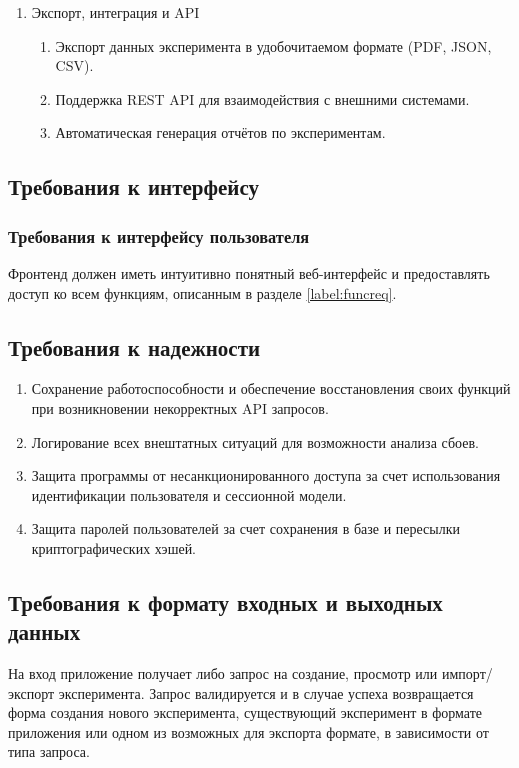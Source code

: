 \documentclass[a4paper,12pt,reqno]{article}
\begin{document}
\begin{enumerate}
        \item Экспорт, интеграция и API
    
        \begin{enumerate}
            \item Экспорт данных эксперимента в удобочитаемом формате (PDF, JSON, CSV).
            \item Поддержка REST API для взаимодействия с внешними системами.
            \item Автоматическая генерация отчётов по экспериментам.
        \end{enumerate}
    \end{enumerate}

    \subsection{Требования к интерфейсу}

    \subsubsection{Требования к интерфейсу пользователя}
    Фронтенд должен иметь интуитивно понятный веб-интерфейс и предоставлять доступ ко всем функциям, описанным в разделе \ref{label:funcreq}.

    \subsection{Требования к надежности}
    \begin{enumerate}
        \item Сохранение работоспособности и обеспечение восстановления своих функций при возникновении некорректных API запросов.
        \item Логирование всех внештатных ситуаций для возможности анализа сбоев.
        \item Защита программы от несанкционированного доступа за счет использования идентификации пользователя и сессионной модели.
        \item Защита паролей пользователей за счет сохранения в базе и пересылки криптографических хэшей.
    \end{enumerate}

    \subsection{Требования к формату входных и выходных данных}
    На вход приложение получает либо запрос на создание, просмотр или импорт/экспорт эксперимента. Запрос валидируется и в случае успеха возвращается форма создания нового эксперимента, существующий эксперимент в формате приложения или одном из возможных для экспорта формате, в зависимости от типа запроса.
\end{document}
